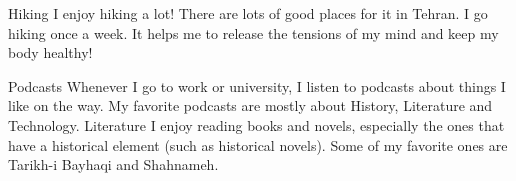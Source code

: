 



\begin{cvskills}
  \cvskill
  {Hiking} %
  {}
  {I enjoy hiking a lot! There are lots of good places for it in Tehran. I go hiking once a week. It helps me to release the tensions of my mind and keep my body healthy! } %

  \cvskill
  {Podcasts} %
  {}
  {Whenever I go to work or university, I listen to podcasts about things I like on the way. My favorite podcasts are mostly about History, Literature and Technology.} %
  \cvskill
  {Literature} %
  {}
  {I enjoy reading books and novels, especially the ones that have a historical element (such as historical novels). Some of my favorite ones are Tarikh-i Bayhaqi and Shahnameh.} %
\end{cvskills}
